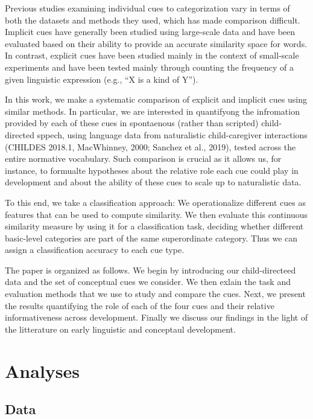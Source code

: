 \documentclass[english,,man,floatsintext]{apa6}
\begin{document}
Previous studies examining individual cues to categorization vary in terms of both the datasets and methods they used, which has made comparison difficult. Implicit cues have
generally been studied using large-scale data and have been evaluated based on their ability to provide an accurate similarity space for words. In contrast, explicit cues have been studied mainly in the context of small-scale experiments and have been tested mainly through counting the frequency of a given linguistic expression (e.g., \enquote{X is a kind of Y}).

In this work, we make a systematic comparison of explicit and implicit cues using similar methods. In particular, we are interested in quantifyong the infromation provided by each of these cues in spontaenous (rather than scripted) child-directed sppech, using language data from naturalistic child-caregiver interactions (CHILDES 2018.1, MacWhinney, 2000; Sanchez et al., 2019), tested across the entire normative vocabulary. Such comparison is crucial as it allows us, for instance, to formualte hypotheses about the relative role each cue could play in development and about the ability of these cues to scale up to naturalistic data.

To this end, we take a classification approach: We operationalize different cues as features that can be used to compute similarity. We then evaluate this continuous similarity measure by using it for a classification task, deciding whether different basic-level categories are part of the same superordinate category. Thus we can assign a classification accuracy to each cue type.

The paper is organized as follows. We begin by introducing our child-directeed data and the set of conceptual cues we consider. We then exlain the task and evaluation methods that we use to study and compare the cues. Next, we present the results quantifying the role of each of the four cues and their relative informativeness across development. Finally we discuss our findings in the light of the litterature on early linguistic and conceptaul development.

\hypertarget{analyses}{%
\section{Analyses}\label{analyses}}

\hypertarget{data}{%
\subsection{Data}\label{data}}
\end{document}
